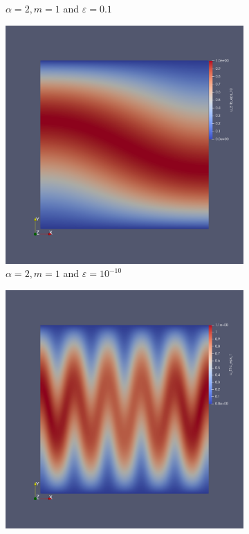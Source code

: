 \documentclass[12pt]{ociamthesis}
\begin{document}
\begin{figure}[H]
\begin{subfigure}{0.44\textwidth}
     \caption{$\alpha=2, m=1$ and $\varepsilon = 0.1$}
 \end{subfigure}
 \begin{subfigure}{0.44\textwidth}
     \includegraphics[width=\textwidth]{Pics/uf/U_E1b_eps_10.png}
     \caption{$\alpha=2, m=1$ and $\varepsilon = 10^{-10}$}
 \end{subfigure}
 \begin{subfigure}{0.44\textwidth}
     \includegraphics[width=\textwidth]{Pics/uf/U_E1c_eps_1.png}

\end{subfigure}
\end{figure}
\end{document}
